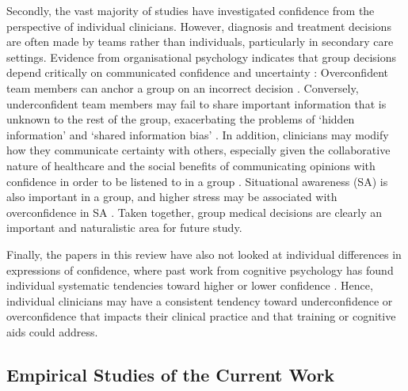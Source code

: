 \documentclass[a4paper, nobind]{templates/ociamthesis}
\begin{document}
\hfill\break
Secondly, the vast majority of studies have investigated confidence from the perspective of individual clinicians. However, diagnosis and treatment decisions are often made by teams rather than individuals, particularly in secondary care settings. Evidence from organisational psychology indicates that group decisions depend critically on communicated confidence and uncertainty \autocite{silver_wise_2021}: Overconfident team members can anchor a group on an incorrect decision \autocite{mahmoodi_equality_2015}. Conversely, underconfident team members may fail to share important information that is unknown to the rest of the group, exacerbating the problems of `hidden information' and `shared information bias' \autocite{stasser_pooling_1985}. In addition, clinicians may modify how they communicate certainty with others, especially given the collaborative nature of healthcare and the social benefits of communicating opinions with confidence in order to be listened to in a group \autocite{brezis_does_2019}. Situational awareness (SA) is also important in a group, and higher stress may be associated with overconfidence in SA \autocite{price_acute_2016}. Taken together, group medical decisions are clearly an important and naturalistic area for future study.

\hfill\break
Finally, the papers in this review have also not looked at individual differences in expressions of confidence, where past work from cognitive psychology has found individual systematic tendencies toward higher or lower confidence \autocite{ais_individual_2016,navajas_idiosyncratic_2017}. Hence, individual clinicians may have a consistent tendency toward underconfidence or overconfidence that impacts their clinical practice and that training or cognitive aids could address.

\subsection*{Empirical Studies of the Current Work}\label{empirical-studies-of-the-current-work}
\end{document}
